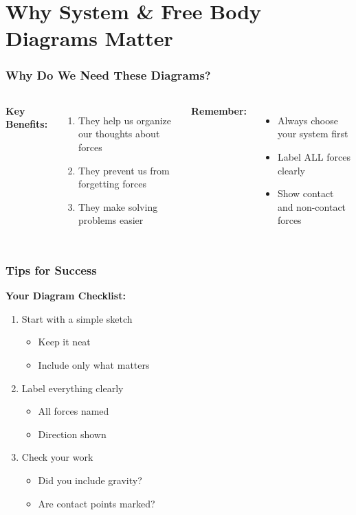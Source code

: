 \documentclass{beamer}
\begin{document}
\section{Why System \& Free Body Diagrams Matter}

\begin{frame}
\frametitle{Why Do We Need These Diagrams?}
\begin{columns}
\textbf{Key Benefits:}
\begin{enumerate}
    \item They help us organize our thoughts about forces
    \item They prevent us from forgetting forces
    \item They make solving problems easier
\end{enumerate}

\vspace{0.3cm}
\textbf{Remember:}
\begin{itemize}
    \item Always choose your system first
    \item Label ALL forces clearly
    \item Show contact and non-contact forces
\end{itemize}

\end{columns}
\end{frame}

\begin{frame}
\frametitle{Tips for Success}
\textbf{Your Diagram Checklist:}
\begin{enumerate}
    \item Start with a simple sketch
    \begin{itemize}
        \item[\Square] Keep it neat
        \item[\Square] Include only what matters
    \end{itemize}
    
    \item Label everything clearly
    \begin{itemize}
        \item[\Square] All forces named
        \item[\Square] Direction shown
    \end{itemize}
    
    \item Check your work
    \begin{itemize}
        \item[\Square] Did you include gravity?
        \item[\Square] Are contact points marked?
    \end{itemize}
\end{enumerate}

\end{frame}
\end{document}
